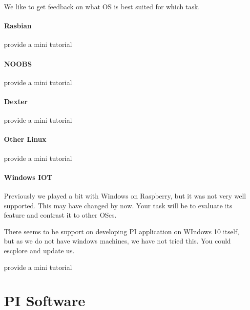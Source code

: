 We like to get feedback on what OS is best suited for which task.

\subsubsection{Rasbian}

\begin{exercise}
provide a mini tutorial 
\end{exercise}

\subsubsection{NOOBS}

\begin{exercise}
provide a mini tutorial 
\end{exercise}

\subsubsection{Dexter}

\begin{exercise}
provide a mini tutorial 
\end{exercise}

\subsubsection{Other Linux}

\begin{exercise}
provide a mini tutorial 
\end{exercise}

\subsubsection{Windows IOT}

Previously we played a bit with Windows on Raspberry, but it was not
very well supported. This may have changed by now. Your task will be to
evaluate its feature and contrast it to other OSes.

There seems to be support on developing PI application on WIndows 10
itself, but as we do not have windows machines, we have not tried
this. You could escplore and update us.

\begin{exercise}
provide a mini tutorial 
\end{exercise}

\chapter{PI Software}

